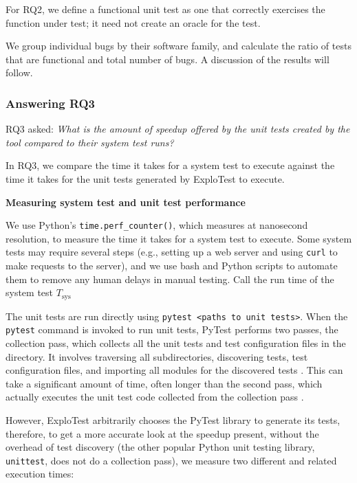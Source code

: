 For RQ2, we define a functional unit test as one that correctly exercises the function under test; it need not create an oracle
for the test.

We group individual bugs by their software family, and calculate the ratio of tests that are functional and total number of bugs.
A discussion of the results will follow.

\label{sec:answering-rq3}
\subsubsection{Answering RQ3}
RQ3 asked: \textit{What is the amount of speedup offered by the unit tests created by the tool compared to their
      system test runs?}

In RQ3, we compare the time it takes for a system test to execute against the time it takes for the unit tests generated by
ExploTest to execute.

\textbf{Measuring system test and unit test performance}

We use Python's \verb|time.perf_counter()|, which measures at nanosecond resolution, to measure the time it takes for a system test to execute. Some system tests
may require several steps (e.g., setting up a web server and using \verb|curl| to make requests to the server), and we use
bash and Python scripts to automate them to remove any human delays in manual testing. Call the run time of the system test
$T_\text{sys}$


The unit tests are run directly using \verb|pytest <paths to unit tests>|. When the \verb|pytest| command is invoked to run
unit tests, PyTest performs two passes, the collection pass, which collects all the unit tests and test configuration files in the directory.
It involves traversing all subdirectories, discovering tests, test configuration files, and importing all modules for the discovered tests \cite{pytestdocs-goodpractices}.
This can take a significant amount of time, often longer than the second pass, which actually executes the unit test code collected from the
collection pass \cite{pytestdocs-importmechanism}.

However, ExploTest arbitrarily chooses the PyTest library to generate its tests, therefore, to get a more accurate look at the speedup
present, without the overhead of test discovery (the other popular Python unit testing library, \verb|unittest|, does not do a collection pass),
we measure two different and related execution times:

